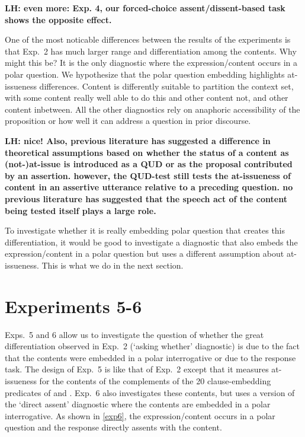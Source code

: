 \documentclass[times,linguex,xcolor]{glossa}
\newcommand{\lh}[1]{\textbf{\color{Cerulean}LH: #1}}
\begin{document}
  \lh{even more: Exp. 4, our forced-choice assent/dissent-based task shows the opposite effect.}

  One of the most noticable differences between the results of the experiments is that Exp.~2 has much larger range and differentiation among the contents. Why might this be? It is the only diagnostic where the expression/content occurs in a polar question. We hypothesize that the polar question embedding highlights at-issueness differences. Content is differently suitable to partition the context set, with some content really well able to do this and other content not, and other content inbetween. All the other diagnostics rely on anaphoric accessibility of the proposition or how well it can address a question in prior discourse.

  \lh{nice! Also, previous literature has suggested a difference in theoretical assumptions based on whether the status of a content as (not-)at-issue is introduced as a QUD or as the proposal contributed by an assertion. however, the QUD-test still tests the at-issueness of content in an assertive utterance relative to a preceding question. no previous literature has suggested that the speech act of the content being tested itself plays a large role.
  }
     
  To investigate whether it is really embedding polar question that creates this differentiation, it would be good to investigate a diagnostic that also embeds the expression/content in a polar question but uses a different assumption about at-issueness. This is what we do in the next section.
        
\section{Experiments 5-6 \label{sec:3_more-experiments}}

  Exps.~5 and 6 allow us to investigate the question of whether the great differentiation observed in Exp.~2 (`asking whether' diagnostic) is due to the fact that the contents were embedded in a polar interrogative or due to the response task. The design of Exp.~5 is like that of Exp.~2 except that it measures at-issueness for the contents of the complements of the 20 clause-embedding predicates of \citealt{tonhauser_how_2018} and \citealt{degen-tonhauser-glossa}. Exp.~6 also investigates these contents, but uses a version of the  `direct assent' diagnostic where the contents are embedded in a polar interrogative. As shown in \ref{exp6}, the expression/content occurs in a polar question and the response directly assents with the content. 
\end{document}
